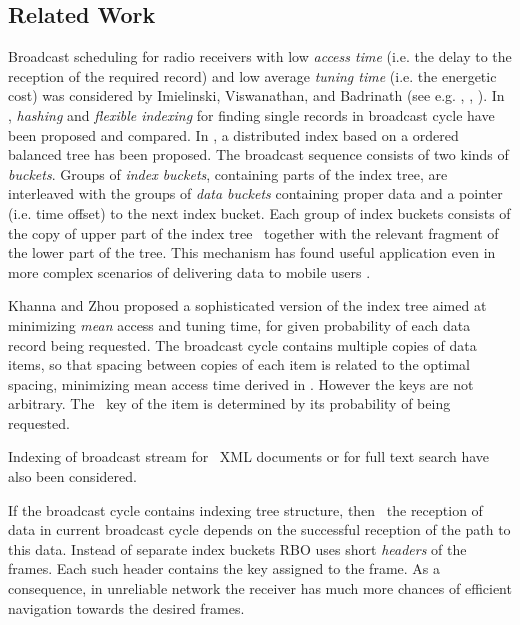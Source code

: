 \documentclass{article}
\newcommand{\tmem}[1]{{\em #1\/}}
\begin{document}
\subsection{ Related Work}

Broadcast scheduling for radio receivers with low {\tmem{access time}} (i.e. the
delay to the reception of the required record) and low average {\tmem{tuning
time}} (i.e. the energetic cost) was considered by Imielinski, Viswanathan, and
Badrinath (see e.g. {\cite{DBLP:conf/sigmod/ImielinskiVB94}},
{\cite{DBLP:conf/edbt/ImielinskiVB94}},
{\cite{DBLP:journals/tkde/ImielinskiVB97}}). In
{\cite{DBLP:conf/edbt/ImielinskiVB94}}, {\tmem{hashing}} and {\tmem{flexible
indexing}} for finding single records in broadcast cycle have been proposed
and compared. In {\cite{DBLP:journals/tkde/ImielinskiVB97}}, a distributed
index based on a ordered balanced tree has been proposed. The broadcast
sequence consists of two kinds of {\tmem{buckets}}. Groups of {\tmem{index
buckets}}, containing parts of the index tree, are interleaved with the groups
of {\tmem{data buckets}} containing proper data and a pointer (i.e. time
offset) to the next index bucket. Each group of index buckets consists of the
copy of upper part of the index tree \ together with the relevant fragment of
the lower part of the tree. This mechanism has found useful application even
in more complex scenarios of delivering data to mobile users
{\cite{DBLP:journals/tods/DattaVCK99}}.

Khanna and Zhou {\cite{Khanna2000575}} proposed a sophisticated version of
the index tree aimed at minimizing {\tmem{mean}} access and tuning time, for
given probability of each data record being requested. The broadcast cycle
contains multiple copies of data items, so that spacing between copies of each
item is related to the optimal spacing, minimizing mean access time derived in
{\cite{DBLP:journals/winet/VaidyaH99}}. However the keys are not arbitrary.
The \ key of the item is determined by its probability of being requested. \

Indexing of broadcast stream for \ XML documents
{\cite{DBLP:journals/isci/ChungL07}} or for full text search
{\cite{DBLP:journals/tkde/ChungYK10}} have also been considered.

If the broadcast cycle contains indexing tree structure, then \ the reception
of data in current broadcast cycle depends on the successful reception of the
path to this data. Instead of separate index buckets RBO uses short
{\tmem{headers}} of the frames. Each such header contains the key assigned to
the frame. As a consequence, in unreliable network the receiver has much more
chances of efficient navigation towards the desired frames.
\end{document}
